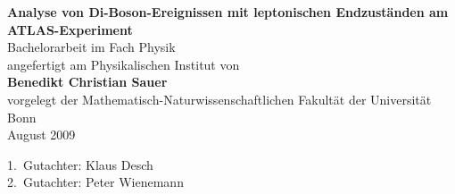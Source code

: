 \documentclass[a4paper,twoside]{scrartcl}
\author{Benedikt Christian Sauer}
\title{\mytitle}
\newcommand{\mytitle}{Analyse von Di-Boson-Ereignissen mit leptonischen
Endzuständen am ATLAS-Experiment}
\begin{document}
\begin{titlepage}
  \begin{center}
    \Huge{\bf\textsf{\mytitle}} \\
    \vspace{3cm}
    \Large Bachelorarbeit im Fach Physik \\
    \vspace{1cm}
    \normalsize angefertigt am Physikalischen Institut von \\
    \vspace{1cm}
    \large{\bf Benedikt Christian Sauer} \\
    \vspace{2cm}
    \normalsize vorgelegt der Mathematisch-Naturwissenschaftlichen Fakultät der Universität
    Bonn \\
    \vspace{1cm}
    \large August 2009
  \end{center}
\end{titlepage}
\newpage
\tableofcontents
\vspace{4cm}
\begin{center}
  \large 1.\ Gutachter: Klaus Desch \\
  \large 2.\ Gutachter: Peter Wienemann
  \vfill
\end{center}
\newpage




\end{document}

